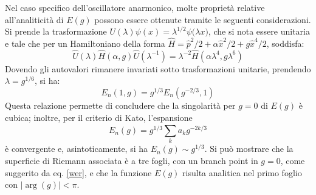\documentclass[11pt, a4paper]{scrartcl} %
\numberwithin{equation}{section}
\theoremstyle{style2}
\theoremstyle{style1}
\begin{document}
Nel caso specifico dell'oscillatore anarmonico, molte propriet\`a relative all'analiticit\`a di $E(g)$ possono essere ottenute tramite le seguenti considerazioni. 
Si prende la trasformazione $U(\lambda ) \psi (x) = \lambda ^{1 / 2} \psi \big(\lambda x\big)$, che si nota essere unitaria e tale che per un Hamiltoniano della forma $\hat{H}= \hat{p}^2 / 2 + \alpha  \hat{x}^2 / 2 + g \hat{x}^4 / 2$, soddisfa:
\begin{equation}
	\hat{U}(\lambda ) \hat{H}(\alpha ,g) \hat{U}(\lambda ^{-1} ) = \lambda ^{-2}  \hat{H}(\alpha \lambda ^4, g \lambda ^6)
\end{equation}
Dovendo gli autovalori rimanere invariati sotto trasformazioni unitarie, prendendo $\lambda = g ^{ 1/6} $, si ha:
\begin{equation}\label{wer}
	E_n(1,g) = g^{1 / 3} E_n(g^{-2 / 3} , 1)
\end{equation}
Questa relazione permette di concludere che la singolarit\`a per $g = 0$ di $E(g)$ \`e cubica; inoltre, per il criterio di Kato, l'espansione
\[
E_n(g) = g^{1 / 3} \sum_{k}^{} a_k g^{ - 2k / 3} 
\]
\`e convergente e, asintoticamente, si ha $E_n(g) \sim g^{ 1/3} $.
Si pu\`o mostrare che la superficie di Riemann associata \`e a tre fogli, con un branch point in $g=0$, come suggerito da eq. \ref{wer}, e che la funzione $E(g)$ risulta analitica nel primo foglio con $\lvert \operatorname{arg} (g) \rvert < \pi $.
\end{document}
